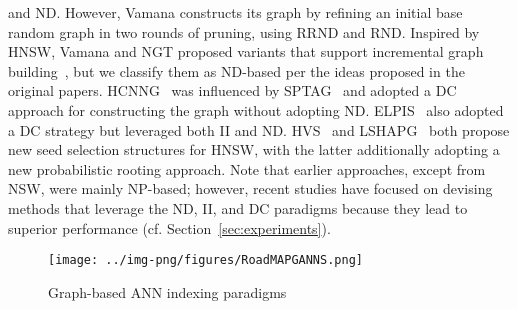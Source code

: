  and ND. 
 However, Vamana constructs its graph by refining an initial base random graph in two rounds of pruning, using RRND and RND. Inspired by HNSW, Vamana and NGT proposed variants %
 that support incremental graph building~\cite{diskanncode, ngt_library}, but we classify them as ND-based per the ideas proposed in the original papers. HCNNG~\cite{hcnng} was influenced by SPTAG~\cite{SPTAG4} and adopted a DC approach for constructing the graph without adopting ND. ELPIS~\cite{elpis} also adopted a DC strategy but leveraged both II and ND. 
HVS~\cite{hvs} and LSHAPG~\cite{lshapg} both propose new seed selection structures for HNSW, with the latter additionally adopting a new probabilistic rooting approach. Note that earlier approaches, except from NSW, were mainly NP-based; however, recent studies have focused on devising methods that leverage the ND, II, and DC paradigms because they lead to superior performance 
(cf. Section~\ref{sec:experiments}).


\begin{figure}[tb] 
		\captionsetup{justification=centering}
		\texttt{[image: ../img-png/figures/RoadMAPGANNS.png]}
        \caption{Graph-based ANN indexing paradigms}
		\label{fig:roadmap}
	
 \end{figure}


